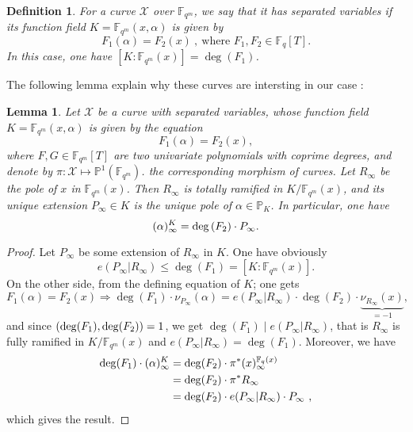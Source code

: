 \documentclass[10pt]{article}
\newtheorem{def1}[thm]{Definition}
\newtheorem{lem1}[thm]{Lemma}
\newcommand{\s}{\vspace{0.3cm}}
\newcommand{\cd}{\cdot}
\newcommand{\PP}{\mathbb{P}}
\newcommand{\fqm}{\mathbb{F}_{q^m}}
\newcommand{\fq}{\mathbb{F}_q}
\newcommand{\X}{\mathcal{X}}
\begin{document}
\s

\begin{def1} \label{courbes à variables séparées}
For a curve $\X$ over $\fqm$, we say that it has separated variables if its function field $K=\fqm(x,\alpha)$ is given by
\[F_1(\alpha) = F_2(x) \ , \ \textrm{where }  F_1,F_2 \in \fq[T].\]
In this case, one have $[K:\fqm(x)] = \deg({F_1})$.
\end{def1}

\s

The following lemma explain why these curves are intersting in our case :

\s

\begin{lem1} \label{lemdegré}
Let $\X$ be a curve with separated variables, whose function field $K=\fqm(x,\alpha)$ is given by the equation
\[F_1(\alpha) = F_2(x),\]
where $F,G \in \fqm[T]$ are two univariate polynomials with coprime degrees, and denote by $\pi : \X \longmapsto \PP^1(\fqm)$. the corresponding morphism of curves. Let $R_{\infty}$ be the pole of $x$ in $\fqm(x)$. Then $R_{\infty}$ is totally ramified in $K/\fqm(x)$, and its unique extension $P_{\infty} \in K$ is the unique pole of $\alpha \in \PP_K$. In particular, one have 
\[(\alpha)^K_{\infty} = \deg{(F_{\rm 2}) \cd P_{\infty}}.\]
\end{lem1}

\s

\begin{proof}
Let $P_{\infty}$ be some extension of $R_{\infty}$ in $K$. One have obviously
\[e(P_{\infty}|R_{\infty}) \leq \deg(F_1)=[K:\fqm(x)].\]
On the other side, from the defining equation of $K$; one gets
\[F_1(\alpha) = F_2(x) \Rightarrow \deg(F_1) \cd \nu_{P_{\infty}}(\alpha) = e(P_{\infty}|R_{\infty}) \cd \deg(F_2) \cd \underbrace{\nu_{R_{\infty}}(x)}_{=-1},\]
and since $(\deg(F_1),\deg( F_{\rm 2}))=1$, we get $\deg(F_1) \mid e(P_{\infty}|R_{\infty})$, that is $R_{\infty}$ is fully ramified in $K/\fqm(x)$ and $e(P_{\infty}|R_{\infty})=\deg(F_1)$. Moreover, we have 
\begin{align*}
\deg(F_1) \cd (\alpha)^K_{\infty} &= \deg(F_{\rm 2}) \cd \pi^*(x)^{\fq(x)}_{\infty} \\
&= \deg(F_{\rm 2}) \cd \pi^* R_{\infty} \\
&= \deg(F_{\rm 2}) \cd e(P_{\infty}|R_{\infty}) \cd P_{\infty} \ ,
\end{align*}
which gives the result.
\end{proof}

\s
\end{document}
